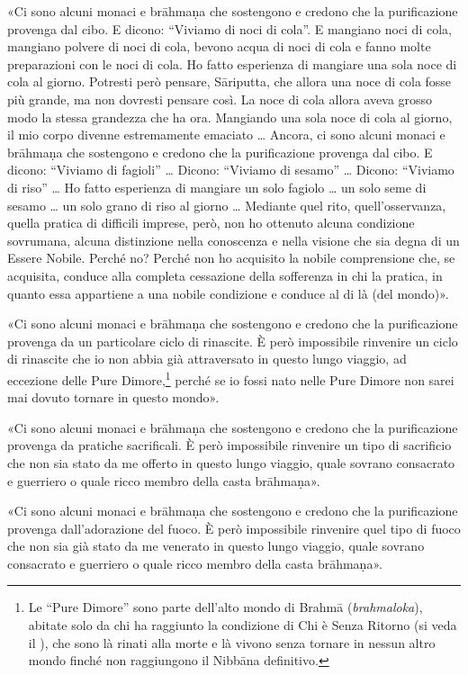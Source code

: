 «Ci sono alcuni monaci e brāhmaṇa che sostengono e credono che la
purificazione provenga dal cibo. E dicono: “Viviamo di noci di cola”. E
mangiano noci di cola, mangiano polvere di noci di cola, bevono acqua di
noci di cola e fanno molte preparazioni con le noci di cola. Ho fatto
esperienza di mangiare una sola noce di cola al giorno. Potresti però
pensare, Sāriputta, che allora una noce di cola fosse più grande, ma non
dovresti pensare così. La noce di cola allora aveva grosso modo la
stessa grandezza che ha ora. Mangiando una sola noce di cola al giorno,
il mio corpo divenne estremamente emaciato … Ancora, ci sono alcuni
monaci e brāhmaṇa che sostengono e credono che la purificazione provenga
dal cibo. E dicono: “Viviamo di fagioli” … Dicono: “Viviamo di sesamo” …
Dicono: “Viviamo di riso” … Ho fatto esperienza di mangiare un solo
fagiolo … un solo seme di sesamo … un solo grano di riso al giorno …
Mediante quel rito, quell’osservanza, quella pratica di difficili
imprese, però, non ho ottenuto alcuna condizione sovrumana, alcuna
distinzione nella conoscenza e nella visione che sia degna di un Essere
Nobile. Perché no? Perché non ho acquisito la nobile comprensione che,
se acquisita, conduce alla completa cessazione della sofferenza in chi
la pratica, in quanto essa appartiene a una nobile condizione e conduce
al di là (del mondo)».


«Ci sono alcuni monaci e brāhmaṇa che sostengono e credono che la
purificazione provenga da un particolare ciclo di rinascite. È però
impossibile rinvenire un ciclo di rinascite che io non abbia già
attraversato in questo lungo viaggio, ad eccezione delle Pure
Dimore,\footnote{Le “Pure Dimore” sono parte dell’alto mondo di Brahmā (\emph{brahmaloka}), abitate solo da chi ha raggiunto la condizione di Chi è Senza Ritorno (si veda il \hyperlink{cap-12-La-Dottrina#pag263}{}), che sono là rinati alla morte e là vivono senza tornare in nessun altro mondo finché non raggiungono il Nibbāna definitivo.} perché se io fossi nato nelle
Pure Dimore non sarei mai dovuto tornare in questo mondo».


«Ci sono alcuni monaci e brāhmaṇa che sostengono e credono che la
purificazione provenga da pratiche sacrificali. È però impossibile
rinvenire un tipo di sacrificio che non sia stato da me offerto in
questo lungo viaggio, quale sovrano consacrato e guerriero o quale ricco
membro della casta brāhmaṇa».


«Ci sono alcuni monaci e brāhmaṇa che sostengono e credono che la
purificazione provenga dall’adorazione del fuoco. È però impossibile
rinvenire quel tipo di fuoco che non sia già stato da me venerato in
questo lungo viaggio, quale sovrano consacrato e guerriero o quale ricco
membro della casta brāhmaṇa».


